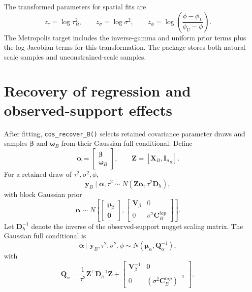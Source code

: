 \documentclass[11pt]{article}
\newcommand{\by}{\bm{y}}
\newcommand{\bbeta}{\bm{\beta}}
\newcommand{\bw}{\bm{\omega}}
\newcommand{\bzero}{\bm{0}}
\newcommand{\bI}{\bm{I}}
\newcommand{\bC}{\bm{C}}
\newcommand{\bD}{\bm{D}}
\newcommand{\bV}{\bm{V}}
\newcommand{\bQ}{\bm{Q}}
\newcommand{\bX}{\bm{X}}
\newcommand{\bZ}{\bm{Z}}
\newcommand{\trans}{^\top}
\begin{document}
The transformed parameters for spatial fits are
\begin{equation}
  z_\tau=\log\tau_B^2,\qquad
  z_\sigma=\log\sigma^2,\qquad
  z_\phi=\log\left(\frac{\phi-\phi_L}{\phi_U-\phi}\right).
\end{equation}
The Metropolis target includes the inverse-gamma and uniform prior terms plus
the log-Jacobian terms for this transformation. The package stores both
natural-scale samples and unconstrained-scale samples.

\section{Recovery of regression and observed-support effects}

After fitting, \texttt{cos\_recover\_B()} selects retained covariance
parameter draws and samples \(\bbeta\) and \(\bw_B\) from their Gaussian full
conditional. Define
\begin{equation}
  \bm{\alpha} =
  \begin{bmatrix}
    \bbeta\\
    \bw_B
  \end{bmatrix},
  \qquad
  \bZ=[\bX_B,\bI_{n_B}].
\end{equation}
For a retained draw of \(\tau^2,\sigma^2,\phi\),
\begin{equation}
  \by_B\mid\bm{\alpha},\tau^2
  \sim N(\bZ\bm{\alpha},\tau^2\bD_h),
\end{equation}
with block Gaussian prior
\begin{equation}
  \bm{\alpha}\sim
  N\left[
  \begin{bmatrix}\bm{\mu}_\beta\\ \bzero\end{bmatrix},
  \begin{bmatrix}
    \bV_\beta & 0\\
    0 & \sigma^2\bC_B^{tap}
  \end{bmatrix}
  \right].
\end{equation}
Let \(\bD_h^{-1}\) denote the inverse of the observed-support nugget scaling
matrix. The Gaussian full conditional is
\begin{equation}
  \bm{\alpha}\mid\by_B,\tau^2,\sigma^2,\phi
  \sim N(\bm{\mu}_\alpha,\bQ_\alpha^{-1}),
\end{equation}
with
\begin{equation}
  \bQ_\alpha =
  \frac{1}{\tau^2}\bZ\trans\bD_h^{-1}\bZ +
  \begin{bmatrix}
    \bV_\beta^{-1} & 0\\
    0 & (\sigma^2\bC_B^{tap})^{-1}
  \end{bmatrix},
\end{equation}
\end{document}
